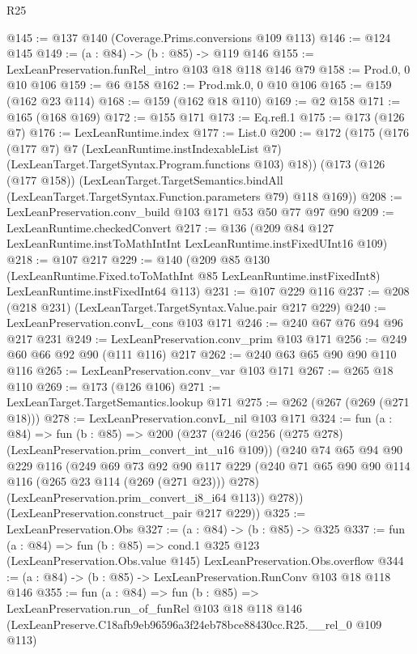 \begin{lexlean}{R25}
\begin{coremodule}
@145 := @137 @140 (Coverage.Prims.conversions @109 @113)
@146 := @124 @145
@149 := (a : @84) -> (b : @85) -> @119 @146
@155 := LexLeanPreservation.funRel_intro @103 @18 @118 @146 @79
@158 := Prod.{0, 0} @10 @106
@159 := @6 @158
@162 := Prod.mk.{0, 0} @10 @106
@165 := @159 (@162 @23 @114)
@168 := @159 (@162 @18 @110)
@169 := @2 @158
@171 := @165 (@168 @169)
@172 := @155 @171
@173 := Eq.refl.{1}
@175 := @173 (@126 @7)
@176 := LexLeanRuntime.index
@177 := List.{0}
@200 := @172
    (@175
      (@176
        (@177 @7)
        @7
        (LexLeanRuntime.instIndexableList @7)
        (LexLeanTarget.TargetSyntax.Program.functions @103)
        @18))
    (@173
      (@126 (@177 @158))
      (LexLeanTarget.TargetSemantics.bindAll
        (LexLeanTarget.TargetSyntax.Function.parameters @79)
        @118
        @169))
@208 := LexLeanPreservation.conv_build @103 @171 @53 @50 @77 @97 @90
@209 := LexLeanRuntime.checkedConvert
@217 := @136 (@209 @84 @127 LexLeanRuntime.instToMathIntInt LexLeanRuntime.instFixedUInt16 @109)
@218 := @107 @217
@229 := @140
    (@209
      @85
      @130
      (LexLeanRuntime.Fixed.toToMathInt @85 LexLeanRuntime.instFixedInt8)
      LexLeanRuntime.instFixedInt64
      @113)
@231 := @107 @229 @116
@237 := @208 (@218 @231) (LexLeanTarget.TargetSyntax.Value.pair @217 @229)
@240 := LexLeanPreservation.convL_cons @103 @171
@246 := @240 @67 @76 @94 @96 @217 @231
@249 := LexLeanPreservation.conv_prim @103 @171
@256 := @249 @60 @66 @92 @90 (@111 @116) @217
@262 := @240 @63 @65 @90 @90 @110 @116
@265 := LexLeanPreservation.conv_var @103 @171
@267 := @265 @18 @110
@269 := @173 (@126 @106)
@271 := LexLeanTarget.TargetSemantics.lookup @171
@275 := @262 (@267 (@269 (@271 @18)))
@278 := LexLeanPreservation.convL_nil @103 @171
@324 := fun (a : @84) =>
  fun (b : @85) =>
  @200
    (@237
      (@246
        (@256 (@275 @278) (LexLeanPreservation.prim_convert_int_u16 @109))
        (@240
          @74
          @65
          @94
          @90
          @229
          @116
          (@249
            @69
            @73
            @92
            @90
            @117
            @229
            (@240 @71 @65 @90 @90 @114 @116 (@265 @23 @114 (@269 (@271 @23))) @278)
            (LexLeanPreservation.prim_convert_i8_i64 @113))
          @278))
      (LexLeanPreservation.construct_pair @217 @229))
@325 := LexLeanPreservation.Obs
@327 := (a : @84) -> (b : @85) -> @325
@337 := fun (a : @84) =>
  fun (b : @85) =>
  cond.{1} @325 @123 (LexLeanPreservation.Obs.value @145) LexLeanPreservation.Obs.overflow
@344 := (a : @84) -> (b : @85) -> LexLeanPreservation.RunConv @103 @18 @118 @146
@355 := fun (a : @84) =>
  fun (b : @85) =>
  LexLeanPreservation.run_of_funRel
    @103
    @18
    @118
    @146
    (LexLeanPreserve.C18afb9eb96596a3f24eb78bce88430cc.R25.__rel_0 @109 @113)
\end{coremodule}
\end{lexlean}
